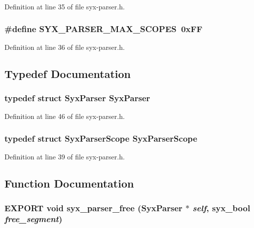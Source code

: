 Definition at line 35 of file syx-parser.h.\hypertarget{syx-parser_8h_1b7fb01cb07bf759bb8ce6fa8d403e61}{
\subsubsection{\setlength{\rightskip}{0pt plus 5cm}\#define SYX\_\-PARSER\_\-MAX\_\-SCOPES~0xFF}}
\label{syx-parser_8h_1b7fb01cb07bf759bb8ce6fa8d403e61}




Definition at line 36 of file syx-parser.h.

\subsection{Typedef Documentation}
\hypertarget{syx-parser_8h_08047a799f946ac82a9e63c3ae9ffb11}{
\subsubsection{\setlength{\rightskip}{0pt plus 5cm}typedef struct {\bf SyxParser} {\bf SyxParser}}}
\label{syx-parser_8h_08047a799f946ac82a9e63c3ae9ffb11}




Definition at line 46 of file syx-parser.h.\hypertarget{syx-parser_8h_ffdbcc3716a97450450d0d0205832811}{
\subsubsection{\setlength{\rightskip}{0pt plus 5cm}typedef struct {\bf SyxParserScope} {\bf SyxParserScope}}}
\label{syx-parser_8h_ffdbcc3716a97450450d0d0205832811}




Definition at line 39 of file syx-parser.h.

\subsection{Function Documentation}
\hypertarget{syx-parser_8h_776f1944e2f6074005eefdc32a8479ff}{
\subsubsection{\setlength{\rightskip}{0pt plus 5cm}EXPORT void syx\_\-parser\_\-free ({\bf SyxParser} $\ast$ {\em self}, \/  {\bf syx\_\-bool} {\em free\_\-segment})}}
\label{syx-parser_8h_776f1944e2f6074005eefdc32a8479ff}


